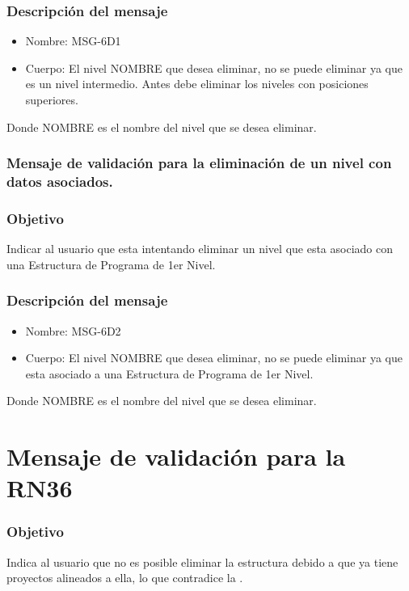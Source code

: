 \subsubsection{Descripción del mensaje}
\begin{itemize}
\item Nombre: MSG-6D1
\item Cuerpo: El nivel NOMBRE que desea eliminar, no se puede eliminar ya que es un nivel intermedio. Antes debe eliminar los niveles con posiciones superiores.

\end{itemize}
Donde NOMBRE es el nombre del nivel que se desea eliminar.

\subsubsection{Mensaje de validación para la eliminación de un nivel con datos asociados.}\label{MSG-6D2}

\subsubsection{Objetivo}
Indicar al usuario que esta intentando eliminar un nivel que esta asociado con una Estructura de Programa de 1er Nivel.

\subsubsection{Descripción del mensaje}
\begin{itemize}
\item Nombre: MSG-6D2
\item Cuerpo: El nivel NOMBRE que desea eliminar, no se puede eliminar ya que esta asociado a una Estructura de Programa de 1er Nivel.
\end{itemize}
Donde NOMBRE es el nombre del nivel que se desea eliminar.

\section{Mensaje de validación para la RN36} \label{MSG_RN36}

\subsubsection{Objetivo}
Indica al usuario que no es posible eliminar la estructura debido a que ya tiene proyectos alineados a ella, lo que contradice la .

